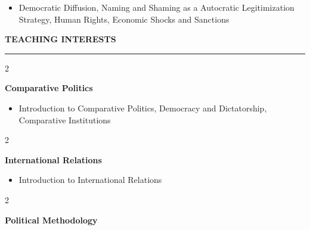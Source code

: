 \documentclass[
  16,
]{article}
\providecommand{\tightlist}{%
  \setlength{\itemsep}{0pt}\setlength{\parskip}{0pt}}
\begin{document}
\begin{itemize}
\tightlist
\item
  Democratic Diffusion, Naming and Shaming as a Autocratic
  Legitimization Strategy, Human Rights, Economic Shocks and Sanctions
\end{itemize}

\vspace{7pt}

\begin{large}{\bf TEACHING INTERESTS}
  \vspace{3pt}
  \hrule
  \begin{multicols}{2}
    \begin{flushleft}{\bf Comparative Politics}\end{flushleft}
    \begin{flushright}\end{flushright}
  \end{multicols}
\end{large}
\vspace{-0.16cm}

\begin{itemize}
\tightlist
\item
  Introduction to Comparative Politics, Democracy and Dictatorship,
  Comparative Institutions
\end{itemize}

\vspace{7pt}

\begin{large}
  \begin{multicols}{2}
    \begin{flushleft}{\bf International Relations}\end{flushleft}
    \begin{flushright}\end{flushright}
  \end{multicols}
\end{large}
\vspace{-0.16cm}

\begin{itemize}
\tightlist
\item
  Introduction to International Relations
\end{itemize}

\vspace{7pt}

\begin{large}
  \begin{multicols}{2}
    \begin{flushleft}{\bf Political Methodology}\end{flushleft}
    \begin{flushright}\end{flushright}
  \end{multicols}
\end{large}
\vspace{-0.16cm}
\end{document}
